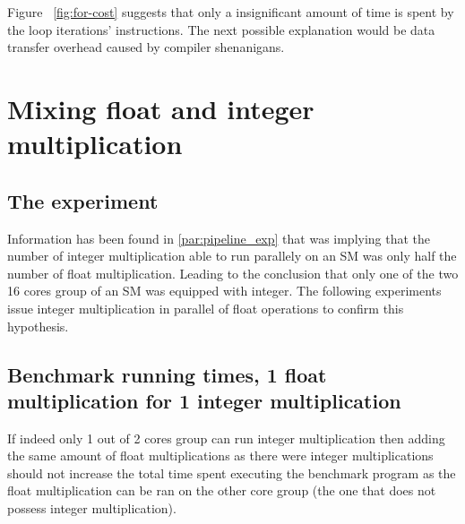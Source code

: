 \documentclass{report}
\begin{document}
    Figure ~\ref{fig:for-cost} suggests that only a insignificant amount of time is spent by the loop
    iterations' instructions. The next possible explanation would be data transfer overhead caused
    by compiler shenanigans.

\section{Mixing float and integer multiplication}
	\subsection{The experiment}
	Information has been found in \ref{par:pipeline_exp} that was implying that the number of 
    integer multiplication able to run parallely on an SM was only half the number of 
    float multiplication. Leading to the conclusion that only one of
    the two 16 cores group of an SM was equipped with integer. The following experiments issue 
    integer multiplication in parallel of float operations to confirm this hypothesis.
	\subsection{Benchmark running times, 1 float multiplication for 1 integer multiplication}
	If indeed only 1 out of 2 cores group can run integer multiplication then
    adding the same amount of float multiplications as there were integer
    multiplications should not increase the total time spent executing the benchmark 
    program as the float multiplication can
    be ran on the other core group (the one that does not possess integer multiplication).
	
\end{document}
